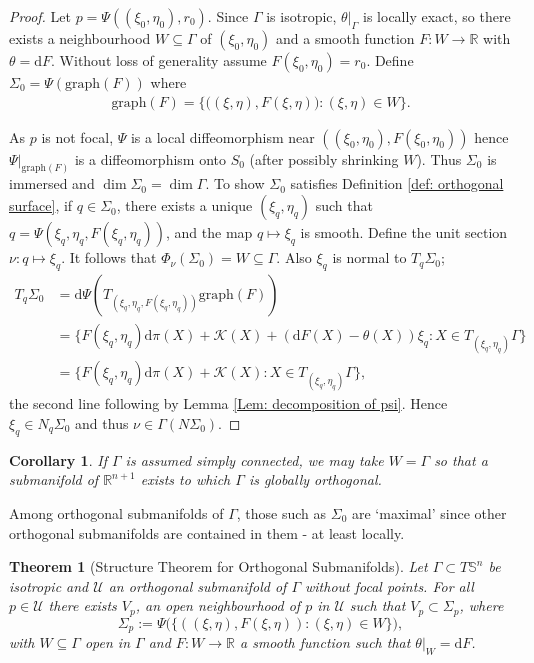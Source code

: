 \documentclass[12pt]{amsart}
\theoremstyle{plain}
\newtheorem{Thm}{Theorem}
\newtheorem{Cor}{Corollary}
\theoremstyle{definition}
\def\R{\mathbb{R}}
\def\S{\mathbb{S}}
\newcommand{\td}{\mathrm{d}}
\numberwithin{equation}{section}
\begin{document}
\begin{proof}
Let $p=\Psi((\xi_0,\eta_0),r_0)$. Since $\Gamma$ is isotropic, $\theta|_{\Gamma}$ is locally exact, so there exists a neighbourhood $W\subseteq\Gamma$ of $(\xi_0,\eta_0)$ and a smooth function $F:W\to\mathbb{R}$ with $\theta=\td F$. Without loss of generality assume $F(\xi_0,\eta_0)=r_0$. Define $\Sigma_0=\Psi(\text{graph}(F))$ where 
\begin{align*}
 \mbox{graph}(F)=\Big\{\big((\xi,\eta),F(\xi,\eta)\big):(\xi,\eta)\in W\Big\}.
\end{align*}

As $p$ is not focal, $\Psi$ is a local diffeomorphism near $((\xi_0,\eta_0),F(\xi_0,\eta_0))$ hence $\Psi|_{\text{graph}(F)}$ is a diffeomorphism onto $S_0$ (after possibly shrinking $W$). Thus $\Sigma_0$ is immersed and $\dim \Sigma_0=\dim\Gamma$. To show $\Sigma_0$ satisfies Definition \ref{def: orthogonal surface}, if $q\in \Sigma_0$, there exists a unique $(\xi_q,\eta_q)$ such that $q=\Psi(\xi_q,\eta_q,F(\xi_q,\eta_q))$, and the map $q\mapsto\xi_q$ is smooth. Define the unit section $\nu:q\mapsto\xi_q$. It follows that $\Phi_\nu(\Sigma_0)=W\subseteq\Gamma$. Also $\xi_q$ is normal to $T_q\Sigma_0$;
\begin{align*}
T_q\Sigma_0&=\td\Psi(T_{(\xi_q,\eta_q,F(\xi_q,\eta_q))}\text{graph}(F))\\
&=\{F(\xi_q,\eta_q)\td\pi(X)+\mathcal{K}(X) + (\td F(X)-\theta(X))\xi_q : X\in T_{(\xi_q,\eta_q)}\Gamma\}\\
&=\{F(\xi_q,\eta_q)\td\pi(X)+\mathcal{K}(X) : X\in T_{(\xi_q,\eta_q)}\Gamma\},
\end{align*}
the second line following by Lemma \ref{Lem: decomposition of psi}. Hence $\xi_q\in N_q\Sigma_0$ and thus $\nu\in\Gamma(N\Sigma_0)$.
\end{proof}
\begin{Cor}\label{cor: gamma simply connected and orthogonal surf}
    If $\Gamma$ is assumed simply connected, we may take $W=\Gamma$ so that a submanifold of $\R^{n+1}$ exists to which $\Gamma$ is globally orthogonal.
\end{Cor}
Among orthogonal submanifolds of $\Gamma$, those such as $\Sigma_0$ are `maximal' since other orthogonal submanifolds are contained in them - at least locally.
\begin{Thm}[Structure Theorem for Orthogonal Submanifolds]\label{Thm: structure theorem for orthogonal submanifolds}
    Let $\Gamma\subset T\S^n$ be isotropic and $\mathcal{U}$ an orthogonal submanifold of $\Gamma$ without focal points. For all $p\in \mathcal{U}$ there exists $V_p$, an open neighbourhood of $p$ in $\mathcal{U}$ such that $V_p\subset \Sigma_p$, where
    \[
    \Sigma_p:=\Psi\Big(\Big\{((\xi,\eta),F(\xi,\eta)): (\xi,\eta)\in W\Big\}\Big),
    \]
    with $W\subseteq\Gamma$ open in $\Gamma$ and $F:W\to \mathbb{R}$ a smooth function such that $\theta|_W=\td F$.
\end{Thm}
\end{document}
